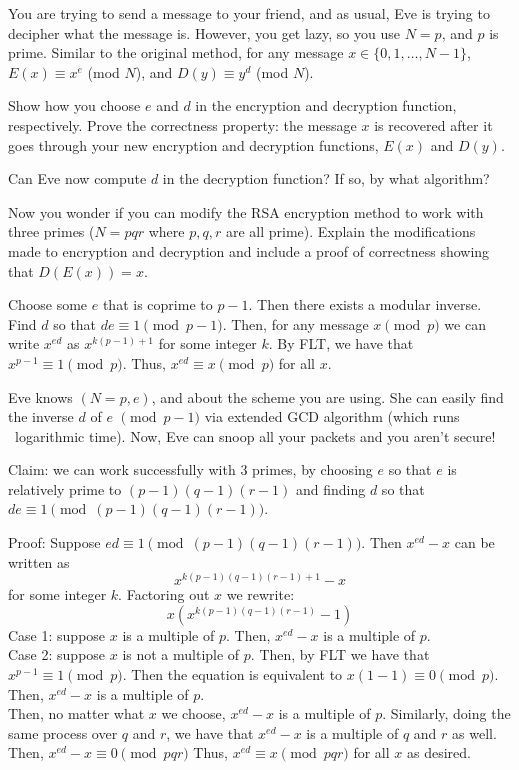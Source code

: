 \documentclass[11pt]{article}
\begin{document}

You are trying to send a message to your friend, and as usual, Eve is trying to decipher what the message is.
  However, you get lazy, so you use $N = p$, and $p$ is prime.
  Similar to the original method, for any message $x \in \{0,1, \ldots, N-1\}$, $E(x) \equiv x^e$ (mod $N$), and $D(y) \equiv y^d$ (mod $N$).
\begin{Parts}
  \Part
  Show how you choose $e$ and $d$ in the encryption and decryption function, respectively. Prove the correctness property: the message $x$ is recovered after it goes through your new encryption and decryption functions, $E(x)$ and $D(y)$.

    \Part
    Can Eve now compute $d$ in the decryption function? If so, by what algorithm?

    \Part Now you wonder if you can modify the RSA encryption method to work with three primes ($N = pqr$ where $p, q, r$ are all prime). Explain the modifications made to encryption and decryption and include a proof of correctness showing that $D(E(x)) = x$.

\end{Parts}
\begin{solution}\begin{Parts}\Part 
Choose some $e$ that is coprime to $p-1$. 
Then there exists a modular inverse. 
Find $d$ so that $de\equiv1\pmod{p-1}$.
Then, for any message $x\pmod{p}$ 
we can write $x^{ed}$ as $x^{k(p-1)+1}$ for some integer $k$.
By FLT, we have that $x^{p-1}\equiv1\pmod{p}$.
Thus, $x^{ed}\equiv x\pmod{p}$ for all $x$.

\Part Eve knows $(N=p, e)$, and about the scheme you are using.
She can easily find the inverse $d$ of $e$ $\pmod{p-1}$ via extended GCD algorithm (which runs ~logarithmic time).
Now, Eve can snoop all your packets and you aren't secure!

\Part 
Claim: we can work successfully with 3 primes, 
by choosing $e$ so that $e$ is relatively prime to $(p-1)(q-1)(r-1)$
and finding $d$ so that $de\equiv1\pmod{(p-1)(q-1)(r-1)}$.

Proof: Suppose $ed\equiv1\pmod{(p-1)(q-1)(r-1)}$.
Then $x^{ed}-x$ can be written as 
$$x^{k(p-1)(q-1)(r-1)+1}-x$$
for some integer $k$.
Factoring out $x$ we rewrite:
$$x(x^{k(p-1)(q-1)(r-1)}-1)$$
Case 1: suppose $x$ is a multiple of $p$. Then, $x^{ed}-x$ is a multiple of $p$.
\\Case 2: suppose $x$ is not a multiple of $p$. 
Then, by FLT we have that $x^{p-1}\equiv1\pmod{p}$.
Then the equation is equivalent to $x(1-1)\equiv0\pmod{p}$.
Then, $x^{ed}-x$ is a multiple of $p$.
\\Then, no matter what $x$ we choose, $x^{ed}-x$ is a multiple of $p$.
Similarly, doing the same process over $q$ and $r$, we have that $x^{ed}-x$ is a multiple of $q$ and $r$ as well.
Then, $x^{ed}-x\equiv0\pmod{pqr}$
Thus, $x^{ed}\equiv x\pmod{pqr}$ for all $x$ as desired.
\end{Parts}\end{solution}\newpage
\end{document}
